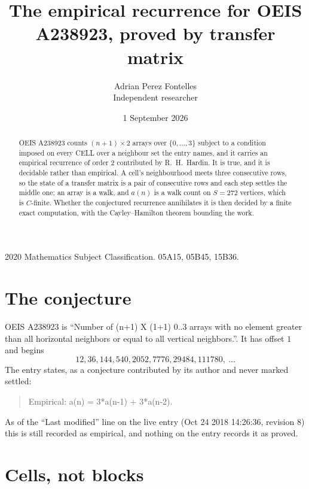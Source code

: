 \documentclass[11pt,a4paper]{article}
\title{The empirical recurrence for OEIS A238923, proved by transfer matrix}
\author{Adrian Perez Fontelles\\ \small Independent researcher}
\date{1 September 2026}
\theoremstyle{plain}
\theoremstyle{definition}
\begin{document}
\maketitle

\begin{abstract}
OEIS A238923 counts $(n+1)\times2$ arrays over $\{0,\dots,3\}$ subject to a condition imposed on
every CELL over a neighbour set the entry names, and it carries an empirical recurrence of
order $2$ contributed by R.~H.~Hardin. It is true, and it is decidable rather than
empirical. A cell's neighbourhood meets three consecutive rows, so the state of a transfer
matrix is a pair of consecutive rows and each step settles the middle one; an array is a
walk, and $a(n)$ is a walk count on $S=272$ vertices, which is $C$-finite. Whether the
conjectured recurrence annihilates it is then decided by a finite exact computation, with the
Cayley--Hamilton theorem bounding the work.
\end{abstract}

\noindent\small 2020 Mathematics Subject Classification. 05A15, 05B45, 15B36.\normalsize

\section{The conjecture}

OEIS A238923 is ``Number of (n+1) X (1+1) 0..3 arrays with no element greater than all horizontal neighbors or equal to all vertical neighbors.''. It has offset $1$ and begins
\[
12, 36, 144, 540, 2052, 7776, 29484, 111780,\ \dots
\]
The entry states, as a conjecture contributed by its author and never marked settled:
\begin{quote}
Empirical: a(n) = 3*a(n-1) + 3*a(n-2).
\end{quote}
As of the ``Last modified'' line on the live entry (Oct 24 2018 14:26:36, revision 8) this is still
recorded as empirical, and nothing on the entry records it as proved.

\section{Cells, not blocks}
\end{document}
